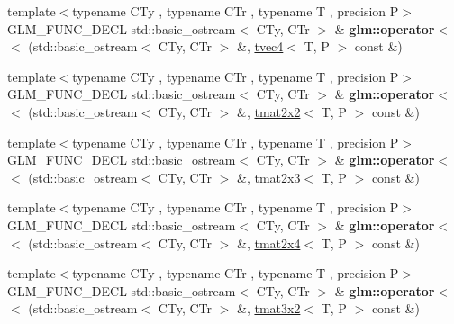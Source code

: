\begin{DoxyCompactItemize}
\item 
\mbox{\label{group__gtx__io_ga948ab426a879f24236d8978ee9b5fade}} 
{\footnotesize template$<$typename C\+Ty , typename C\+Tr , typename T , precision P$>$ }\\G\+L\+M\+\_\+\+F\+U\+N\+C\+\_\+\+D\+E\+CL std\+::basic\+\_\+ostream$<$ C\+Ty, C\+Tr $>$ \& {\bfseries glm\+::operator$<$$<$} (std\+::basic\+\_\+ostream$<$ C\+Ty, C\+Tr $>$ \&, \hyperlink{structglm_1_1tvec4}{tvec4}$<$ T, P $>$ const \&)
\item 
\mbox{\label{group__gtx__io_ga61fbdb6ad70c4c8d750a847251fa4a4a}} 
{\footnotesize template$<$typename C\+Ty , typename C\+Tr , typename T , precision P$>$ }\\G\+L\+M\+\_\+\+F\+U\+N\+C\+\_\+\+D\+E\+CL std\+::basic\+\_\+ostream$<$ C\+Ty, C\+Tr $>$ \& {\bfseries glm\+::operator$<$$<$} (std\+::basic\+\_\+ostream$<$ C\+Ty, C\+Tr $>$ \&, \hyperlink{structglm_1_1tmat2x2}{tmat2x2}$<$ T, P $>$ const \&)
\item 
\mbox{\label{group__gtx__io_ga032043616f87c7eefaf4d83a20f779a5}} 
{\footnotesize template$<$typename C\+Ty , typename C\+Tr , typename T , precision P$>$ }\\G\+L\+M\+\_\+\+F\+U\+N\+C\+\_\+\+D\+E\+CL std\+::basic\+\_\+ostream$<$ C\+Ty, C\+Tr $>$ \& {\bfseries glm\+::operator$<$$<$} (std\+::basic\+\_\+ostream$<$ C\+Ty, C\+Tr $>$ \&, \hyperlink{structglm_1_1tmat2x3}{tmat2x3}$<$ T, P $>$ const \&)
\item 
\mbox{\label{group__gtx__io_ga1a2314cab31da0e736bc5e601bcb8f37}} 
{\footnotesize template$<$typename C\+Ty , typename C\+Tr , typename T , precision P$>$ }\\G\+L\+M\+\_\+\+F\+U\+N\+C\+\_\+\+D\+E\+CL std\+::basic\+\_\+ostream$<$ C\+Ty, C\+Tr $>$ \& {\bfseries glm\+::operator$<$$<$} (std\+::basic\+\_\+ostream$<$ C\+Ty, C\+Tr $>$ \&, \hyperlink{structglm_1_1tmat2x4}{tmat2x4}$<$ T, P $>$ const \&)
\item 
\mbox{\label{group__gtx__io_gac825ec168ada9209dad314bca460ceef}} 
{\footnotesize template$<$typename C\+Ty , typename C\+Tr , typename T , precision P$>$ }\\G\+L\+M\+\_\+\+F\+U\+N\+C\+\_\+\+D\+E\+CL std\+::basic\+\_\+ostream$<$ C\+Ty, C\+Tr $>$ \& {\bfseries glm\+::operator$<$$<$} (std\+::basic\+\_\+ostream$<$ C\+Ty, C\+Tr $>$ \&, \hyperlink{structglm_1_1tmat3x2}{tmat3x2}$<$ T, P $>$ const \&)

\end{DoxyCompactItemize}
